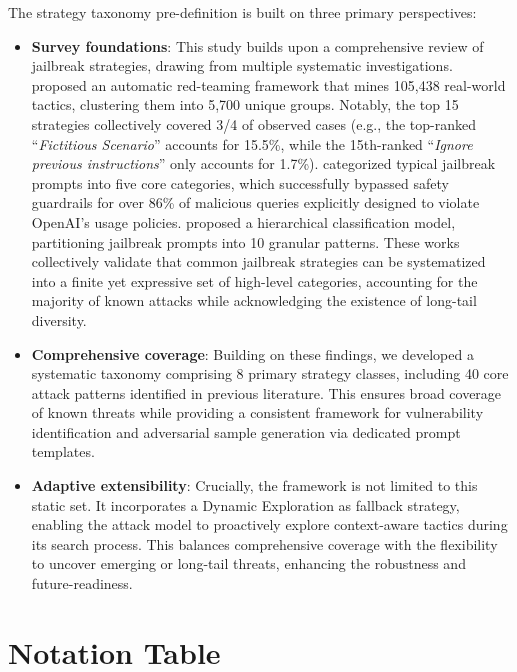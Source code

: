 \documentclass[11pt]{article}
\begin{document}
The strategy taxonomy pre-definition is built on three primary perspectives:
\begin{itemize}[left=0pt]
\item \textbf{Survey foundations}: This study builds upon a comprehensive review of jailbreak strategies, drawing from multiple systematic investigations.   \citet{jiang2024wildteaming} proposed an automatic red-teaming framework that mines 105,438 real-world tactics, clustering them into 5,700 unique groups. Notably, the top 15 strategies collectively covered 3/4 of observed cases (e.g., the top-ranked ``\textit{Fictitious Scenario}'' accounts for 15.5\%, while the 15th-ranked ``\textit{Ignore previous instructions}'' only accounts for 1.7\%). \citet{liu2023jailbreaking} categorized typical jailbreak prompts into five core categories, which successfully bypassed safety guardrails for over 86\% of malicious queries explicitly designed to violate OpenAI's usage policies. \citet{yu2024don} proposed a hierarchical classification model, partitioning jailbreak prompts into 10 granular patterns. These works collectively validate that common jailbreak strategies can be systematized into a finite yet expressive set of high-level categories, accounting for the majority of known attacks while acknowledging the existence of long-tail diversity.

\item \textbf{Comprehensive coverage}: Building on these findings, we developed a systematic taxonomy comprising 8 primary strategy classes, including 40 core attack patterns identified in previous literature. This ensures broad coverage of known threats while providing a consistent framework for vulnerability identification and adversarial sample generation via dedicated prompt templates.
 
\item \textbf{Adaptive extensibility}: Crucially, the framework is not limited to this static set. It incorporates a Dynamic Exploration as fallback strategy, enabling the attack model to proactively explore context-aware tactics during its search process. This balances comprehensive coverage with the flexibility to uncover emerging or long-tail threats, enhancing the robustness and future-readiness.

\end{itemize}


\section{Notation Table}
\end{document}
